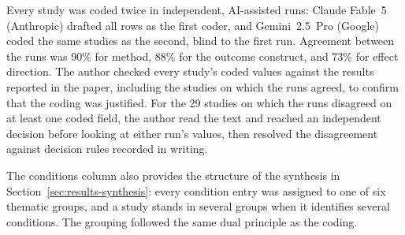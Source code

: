 Every study was coded twice in independent, AI-assisted runs: Claude Fable~5 (Anthropic) drafted all rows as the first coder, and Gemini~2.5~Pro (Google) coded the same studies as the second, blind to the first run. Agreement between the runs was 90\% for method, 88\% for the outcome construct, and 73\% for effect direction. The author checked every study's coded values against the results reported in the paper, including the studies on which the runs agreed, to confirm that the coding was justified. For the 29 studies on which the runs disagreed on at least one coded field, the author read the text and reached an independent decision before looking at either run's values, then resolved the disagreement against decision rules recorded in writing.

The conditions column also provides the structure of the synthesis in Section~\ref{sec:results-synthesis}: every condition entry was assigned to one of six thematic groups, and a study stands in several groups when it identifies several conditions. The grouping followed the same dual principle as the coding.
